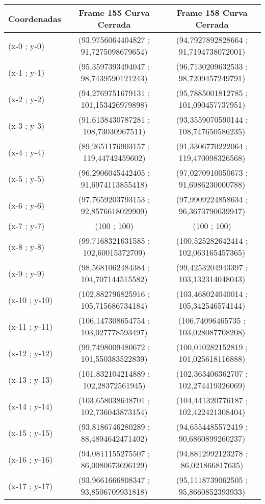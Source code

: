 \begin{table}[htbp]
	\centering
	\begin{tabular}{|l|c|c|}
		\hline
		Coordenadas & Frame 155 Curva Cerrada & Frame 158 Curva Cerrada \\ \hline
		(x-0 ; y-0) & (93,9756064404827 ; 91,7275098679654) & (94,7927892828664 ; 91,7194738072001) \\
		(x-1 ; y-1) & (95,3597393494047 ; 98,7439590121243) & (96,7130209632533 ; 98,7209457249791) \\
		(x-2 ; y-2) & (94,2769751679131 ; 101,153426979898) & (95,7885001812785 ; 101,090457737951) \\
		(x-3 ; y-3) & (91,6138430787281 ; 108,73030967511) & (93,3559070590144 ; 108,747650586235) \\
		(x-4 ; y-4) & (89,2651176903157 ; 119,44742459602) & (91,3306770222064 ; 119,470098326568) \\
		(x-5 ; y-5) & (96,2906045442405 ; 91,6974113855418) & (97,0270910050673 ; 91,6986230000788) \\
		(x-6 ; y-6) & (97,7659203793153 ; 92,8576618029909) & (97,9909224858634 ; 96,3673790639947) \\
		(x-7 ; y-7) & (100 ; 100) & (100 ; 100) \\
		(x-8 ; y-8) & (99,7168321631585 ; 102,60015372709) & (100,525282642414 ; 102,063165457365) \\
		(x-9 ; y-9) & (98,5681062484384 ; 104,707144515582) & (99,4253204943397 ; 103,132314048043) \\
		(x-10 ; y-10) & (102,882796825916 ; 105,715686734184) & (103,468024040014 ; 105,342546574144) \\
		(x-11 ; y-11) & (106,147308654754 ; 103,027778593497) & (106,74096465735 ; 103,028087708208) \\
		(x-12 ; y-12) & (99,7498009480672 ; 101,550383522839) & (100,010282152819 ; 101,025618116888) \\
		(x-13 ; y-13) & (101,832104214889 ; 102,28372561945) & (102,363406362707 ; 102,274419326069) \\
		(x-14 ; y-14) & (103,658038648701 ; 102,736043873154) & (104,441320776187 ; 102,422421308404) \\
		(x-15 ; y-15) & (93,8186746280289 ; 88,4894642471402) & (94,6554485572419 ; 90,6860899260237) \\
		(x-16 ; y-16) & (94,0811155275507 ; 86,0080673696129) & (94,8812992123278 ; 86,021866817635) \\
		(x-17 ; y-17) & (93,9661666808347 ; 93,8506709931818) & (95,1118739062505 ; 95,8660852393933) \\

\end{tabular}
\end{table}
